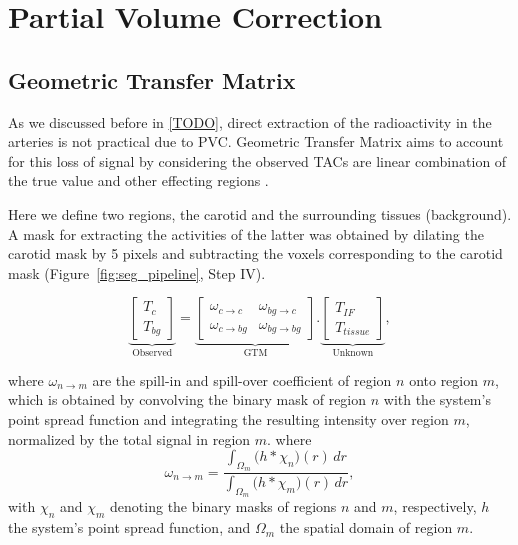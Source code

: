\section{Partial Volume Correction}
\subsection{Geometric Transfer Matrix}
As we discussed before in \ref{TODO}, direct extraction of the radioactivity in the arteries is not practical due to PVC.
Geometric Transfer Matrix aims to account for this loss of signal by considering the observed TACs are linear combination of the true value and other effecting regions \cite{rousset1998correction}.

Here we define two regions, the carotid and the surrounding tissues (background).
A mask for extracting the activities of the latter was obtained by dilating the carotid mask by 5 pixels and subtracting the voxels corresponding to the carotid mask (Figure~\ref{fig:seg_pipeline}, Step IV).

\begin{equation}
	\underbrace{
		\begin{bmatrix}
			T_{c} \\
			T_{bg}
		\end{bmatrix}
	}_{\text{Observed}}
	=
	\underbrace{
		\begin{bmatrix}
			\omega_{c \rightarrow c}  & \omega_{bg \rightarrow c}  \\
			\omega_{c \rightarrow bg} & \omega_{bg \rightarrow bg}
		\end{bmatrix}
	}_{\text{GTM}}
	.
	\underbrace{
		\begin{bmatrix}
			T_{IF} \\
			T_{tissue}
		\end{bmatrix}
	}_{\text{Unknown}},
\end{equation}

where $\omega_{n \rightarrow m}$ are the spill-in and spill-over coefficient of region $n$ onto region $m$, which is obtained by convolving the binary mask of region $n$ with the system's point spread function and integrating the resulting intensity over region $m$, normalized by the total signal in region $m$.
where
\begin{equation}
	\omega_{n\to m} = \frac{\displaystyle \int_{\Omega_m} \bigl( h \ast \chi_n \bigr)(r)\,dr}{\displaystyle \int_{\Omega_m} \bigl( h \ast \chi_m \bigr)(r)\,dr},
\end{equation}
with \(\chi_n\) and \(\chi_m\) denoting the binary masks of regions \(n\) and \(m\), respectively, \(h\) the system's point spread function, and \(\Omega_m\) the spatial domain of region \(m\).

